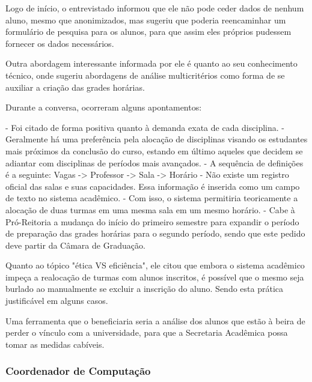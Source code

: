
Logo de início, o entrevistado informou que ele não pode ceder dados de nenhum aluno, mesmo que anonimizados, mas sugeriu que poderia reencaminhar um formulário de pesquisa para os alunos, para que assim eles próprios pudessem fornecer os dados necessários.

Outra abordagem interessante informada por ele é quanto ao seu conhecimento técnico, onde sugeriu abordagens de análise multicritérios como forma de se auxiliar a criação das grades horárias.

Durante a conversa, ocorreram alguns apontamentos:

- Foi citado de forma positiva quanto à demanda exata de cada disciplina.
- Geralmente há uma preferência pela alocação de disciplinas visando os estudantes mais próximos da conclusão do curso, estando em último aqueles que decidem se adiantar com disciplinas de períodos mais avançados.
- A sequência de definições é a seguinte: Vagas -> Professor -> Sala -> Horário
- Não existe um registro oficial das salas e suas capacidades. Essa informação é inserida como um campo de texto no sistema acadêmico.
  - Com isso, o sistema permitiria teoricamente a alocação de duas turmas em uma mesma sala em um mesmo horário.
- Cabe à Pró-Reitoria a mudança do início do primeiro semestre para expandir o período de preparação das grades horárias para o segundo período, sendo que este pedido deve partir da Câmara de Graduação.

Quanto ao tópico "ética VS eficiência", ele citou que embora o sistema acadêmico impeça a realocação de turmas com alunos inscritos, é possível que o mesmo seja burlado ao manualmente se excluir a inscrição do aluno. Sendo esta prática justificável em alguns casos.

Uma ferramenta que o beneficiaria seria a análise dos alunos que estão à beira de perder o vínculo com a universidade, para que a Secretaria Acadêmica possa tomar as medidas cabíveis.

\subsubsection{Coordenador de Computação} %

